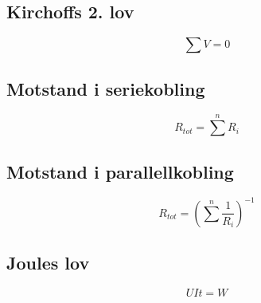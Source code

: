 \documentclass{article}
\begin{document}
\subsection{Kirchoffs 2. lov}

$$\sum V=0$$

\subsection{Motstand i seriekobling}

$$R_{tot}=\sum^n R_i$$

\subsection{Motstand i parallellkobling}

$$R_{tot}=\left(\sum^n \frac{1}{R_i}\right)^{-1}$$

\subsection{Joules lov}

$$UIt=W$$




\end{document}
